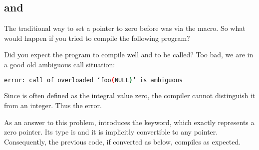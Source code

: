 \subsection{ and }

The traditional way to set a pointer to zero before  was via the
 macro. So what would happen if you tried to compile the
following program?



Did you expect the program to compile well and  to be
called? Too bad, we are in a good old ambiguous call situation:

\begin{lstlisting}[language=bash]
error: call of overloaded ‘foo(NULL)’ is ambiguous
\end{lstlisting}

Since  is often defined as the integral value zero, the
compiler cannot distinguish it from an integer. Thus the error.

\bigskip

As an answer to this problem,  introduces the 
keyword, which exactly represents a zero pointer. Its type is
 and it is implicitly convertible to any
pointer. Consequently, the previous code, if converted as below,
compiles as expected.


